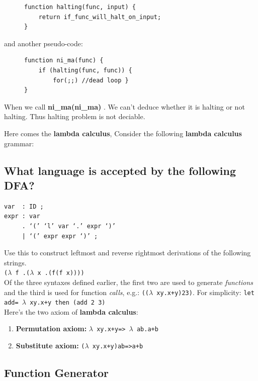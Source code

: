 \documentclass[a4paper]{exam}
\begin{document}
\begin{figure}[H]
    \begin{verbatim}
function halting(func, input) {
    return if_func_will_halt_on_input;
}
    \end{verbatim}
\end{figure}
and another pseudo-code:
\begin{figure}[H]
     \begin{verbatim}
function ni_ma(func) {
    if (halting(func, func)) {
        for(;;) //dead loop }
}
    \end{verbatim}
\end{figure}

When we call \textbf { ni\_ma(ni\_ma) }. We can't deduce whether it is halting or not halting. Thus halting problem is not deciable.


Here comes the \textbf{lambda calculus}, Consider the following \textbf{lambda calculus} grammar:
\subsection{What language is accepted by the following DFA?}
\begin{verbatim}
var  : ID ;
expr : var
     . ‘(’ ‘l’ var ‘.’ expr ‘)’
     | ‘(’ expr expr ‘)’ ;
\end{verbatim}

Use this \cite{lambdacpptest} to construct leftmost and reverse rightmost derivations of the following strings.
\\
\texttt{($\lambda$ f .($\lambda$ x .(f(f x))))}
\\
Of the three syntaxes defined earlier, the first two are used to generate \textit{functions} and the third is used for function \textit{calls}, e.g.:  \texttt{(($\lambda$ xy.x+y)23)}. For simplicity:  \texttt{let add= $\lambda$ xy.x+y then (add 2 3)}\\

Here's the two axiom of \textbf{lambda calculus}:
\begin{enumerate}
\item \textbf{Permutation axiom:} \texttt{$\lambda$ xy.x+y=> $\lambda$ ab.a+b}
\item \textbf{Substitute axiom:} \texttt{($\lambda$ xy.x+y)ab=>a+b}
\end{enumerate}

\subsection{Function Generator}
\end{document}
